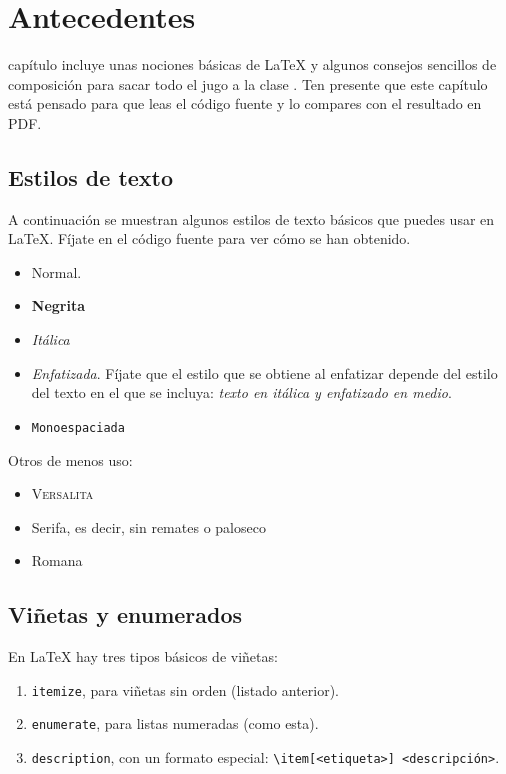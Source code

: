 \chapter{Antecedentes}
\label{chap:antecedentes}

 capítulo incluye unas nociones básicas de \LaTeX{} y algunos consejos sencillos de composición para sacar todo el jugo a la clase \giitatfg. Ten presente que este capítulo está pensado para que leas el código fuente y lo compares con el resultado en PDF.

\section{Estilos de texto}

A continuación se muestran algunos estilos de texto básicos que puedes usar en \LaTeX{}. Fíjate en el código fuente para ver cómo se han obtenido.

\begin{itemize}
  \item Normal.
  \item \textbf{Negrita}
  \item \textit{Itálica}
  \item \emph{Enfatizada}. Fíjate que el estilo que se obtiene al enfatizar depende del estilo del texto en el que se incluya: \textit{texto en itálica y \emph{enfatizado} en medio}.
  \item \texttt{Monoespaciada}
\end{itemize}

Otros de menos uso:

\begin{itemize}
  \item \textsc{Versalita}
  \item \textsf{Serifa}, es decir, sin remates o paloseco
  \item \textrm{Romana}
\end{itemize}


\section{Viñetas y enumerados}

En \LaTeX{} hay tres tipos básicos de viñetas:

\begin{enumerate}
  \item \texttt{itemize}, para viñetas sin orden (listado anterior).
  \item \texttt{enumerate}, para listas numeradas (como esta).
  \item \texttt{description}, con un formato especial: \texttt{\textbackslash item[<etiqueta>] <descripción>}.
\end{enumerate}


